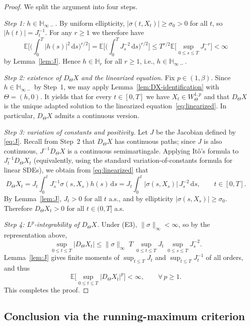 \documentclass[11pt]{article}
\newcommand{\E}{\mathbb{E}}
\newcommand{\Hb}{\mathbb{H}}
\newcommand{\1}{\mathbf{1}}
\newcommand{\dd}{\mathrm{d}}
\theoremstyle{plain}
\theoremstyle{definition}
\theoremstyle{remark}
\begin{document}
\begin{proof}
We split the argument into four steps.

\medskip
\noindent\emph{Step 1: $h\in \Hb_{\infty-}$.}
By uniform ellipticity, $|\sigma(t,X_t)|\ge \sigma_0>0$ for all $t$, so $|h(t)|=J_t^{-1}$.
For any $r\ge 1$ we therefore have
\[
\E\Big[\Big(\int_0^T |h(s)|^2\,\dd s\Big)^{r/2}\Big]
=\E\Big[\Big(\int_0^T J_s^{-2}\,\dd s\Big)^{r/2}\Big]
\le T^{r/2}\E\Big[\sup_{0\le s\le T}J_s^{-r}\Big]<\infty
\]
by Lemma~\ref{lem:J}. Hence $h\in \Hb_r$ for all $r\ge 1$, i.e., $h\in \Hb_{\infty-}$.

\medskip
\noindent\emph{Step 2: existence of $D_\Theta X$ and the linearized equation.}
Fix $p\in(1,\beta)$.
Since $h\in \Hb_{\infty-}$ by Step~1, we may apply Lemma~\ref{lem:DX-identification} with $\Theta=(h,0)$.
It yields that for every $t\in[0,T]$ we have $X_t\in W^{1,p}_\Theta$ and that $D_\Theta X$ is the unique adapted solution to the linearized equation~\eqref{eq:linearized}.
In particular, $D_\Theta X$ admits a continuous version.

\medskip
\noindent\emph{Step 3: variation of constants and positivity.}
Let $J$ be the Jacobian defined by \eqref{eq:J}. Recall from Step~2 that $D_\Theta X$ has continuous paths; since $J$ is also continuous, $J^{-1}D_\Theta X$ is a continuous semimartingale.
Applying It\^o's formula to $J_t^{-1}D_\Theta X_t$ (equivalently, using the standard variation-of-constants formula for linear SDEs), we obtain from \eqref{eq:linearized} that
\begin{equation}\label{eq:DX-formula}
D_\Theta X_t
=J_t\int_0^t J_s^{-1}\sigma(s,X_s)h(s)\,\dd s
=J_t\int_0^t |\sigma(s,X_s)|\,J_s^{-2}\,\dd s,\qquad t\in[0,T].
\end{equation}
By Lemma~\ref{lem:J}, $J_t>0$ for all $t$ a.s., and by ellipticity $|\sigma(s,X_s)|\ge\sigma_0$.
Therefore $D_\Theta X_t>0$ for all $t\in(0,T]$ a.s.

\medskip
\noindent\emph{Step 4: $L^p$-integrability of $D_\Theta X$.}
Under (E3), $\|\sigma\|_\infty<\infty$, so by the representation above,
\[
\sup_{0\le t\le T}|D_\Theta X_t|
\le \|\sigma\|_\infty\;T\;\sup_{0\le t\le T}J_t\;\sup_{0\le s\le T}J_s^{-2}.
\]
Lemma~\ref{lem:J} gives finite moments of $\sup_{t\le T}J_t$ and $\sup_{t\le T}J_t^{-1}$ of all orders, and thus
\[
\E\Big[\sup_{0\le t\le T}|D_\Theta X_t|^p\Big]<\infty,\qquad \forall\,p\ge1.
\]
This completes the proof.
\end{proof}

\subsection{Conclusion via the running-maximum criterion}
\end{document}
